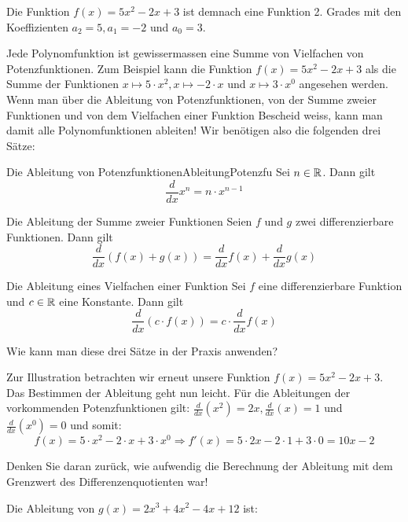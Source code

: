 \begin{bsp}
	{}{}
	Die Funktion $f(x)=5x^2-2x+3$ ist demnach eine Funktion 2. Grades mit den Koeffizienten $a_2=5, a_1=-2$ und $a_0=3$.
\end{bsp}

Jede Polynomfunktion ist gewissermassen eine Summe von Vielfachen von Potenzfunktionen. Zum Beispiel kann die Funktion $f(x)=5x^2-2x+3$ als die Summe der Funktionen $x\mapsto 5\cdot x^2, x\mapsto -2\cdot x$ und $x\mapsto 3\cdot x^0$ angesehen werden. Wenn man über die Ableitung von Potenzfunktionen, von der Summe zweier Funktionen und von dem Vielfachen einer Funktion Bescheid weiss, kann man damit alle Polynomfunktionen ableiten! Wir benötigen also die folgenden drei Sätze:
\begin{satz}
	{Die Ableitung von Potenzfunktionen}{AbleitungPotenzfu}
	Sei $n\in \mathbb{R}$. Dann gilt
	$$\frac{d}{dx} x^n = n\cdot x^{n-1}$$

\end{satz}

\begin{satz}
	{Die Ableitung der Summe zweier Funktionen}{}
	Seien $f$ und $g$ zwei differenzierbare Funktionen. Dann gilt
	$$\frac{d}{dx} \left(f(x)+g(x)\right) = \frac{d}{dx} f(x) + \frac{d}{dx} g(x)$$
\end{satz}

\begin{satz}
	{Die Ableitung eines Vielfachen einer Funktion}{}
	Sei $f$ eine differenzierbare Funktion und $c\in \mathbb{R}$ eine Konstante. Dann gilt
	$$\frac{d}{dx}\left(c\cdot f(x)\right) = c\cdot \frac{d}{dx} f(x)$$

\end{satz}


Wie kann man diese drei Sätze in der Praxis anwenden?
\begin{bsp}
	{}{}
	Zur Illustration betrachten wir erneut unsere Funktion $f(x)=5x^2-2x+3$. Das Bestimmen der Ableitung geht nun leicht. Für die Ableitungen der vorkommenden Potenzfunktionen gilt: $\frac{d}{dx} (x^2 )=2x,  \frac{d}{dx}(x)=1$ und $\frac{d}{dx} (x^0 )=0$ und somit:
	$$ f(x)=5\cdot x^2-2\cdot x+3\cdot x^0 \Rightarrow f'(x)=5\cdot 2x-2\cdot 1+3\cdot 0=10x-2$$
\end{bsp}

Denken Sie daran zurück, wie aufwendig die Berechnung der Ableitung mit dem Grenzwert des Differenzenquotienten war!
\begin{bsp}
	{}{}Die Ableitung von $g(x)=2x^3+4x^2-4x+12$ ist:
	\vspace*{2cm}
\end{bsp}

